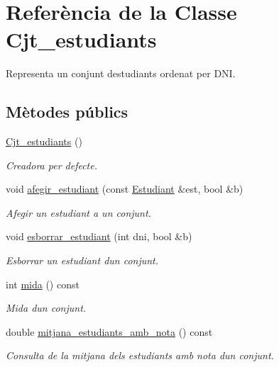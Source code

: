 \hypertarget{class_cjt__estudiants}{}\section{Referència de la Classe Cjt\+\_\+estudiants}
\label{class_cjt__estudiants}


Representa un conjunt d\textquotesingle{}estudiants ordenat per D\+NI.  


\subsection*{Mètodes públics}
\begin{DoxyCompactItemize}
\item 
\hyperlink{class_cjt__estudiants_a31ffe72cadcf58d82c8b9f6659c56e7a}{Cjt\+\_\+estudiants} ()
\begin{DoxyCompactList}\small\item\em Creadora per defecte. \end{DoxyCompactList}\item 
void \hyperlink{class_cjt__estudiants_a4188715904e017fa15b9ad8bc63112b6}{afegir\+\_\+estudiant} (const \hyperlink{class_estudiant}{Estudiant} \&est, bool \&b)
\begin{DoxyCompactList}\small\item\em Afegir un estudiant a un conjunt. \end{DoxyCompactList}\item 
void \hyperlink{class_cjt__estudiants_a6632e0cecaa9d698cb51da07c9e58402}{esborrar\+\_\+estudiant} (int dni, bool \&b)
\begin{DoxyCompactList}\small\item\em Esborrar un estudiant d\textquotesingle{}un conjunt. \end{DoxyCompactList}\item 
int \hyperlink{class_cjt__estudiants_a87c69704a0eff48a301cfff05e6dd587}{mida} () const
\begin{DoxyCompactList}\small\item\em Mida d\textquotesingle{}un conjunt. \end{DoxyCompactList}\item 
double \hyperlink{class_cjt__estudiants_a8c8099d5080864a677743e5e1d1bbdf8}{mitjana\+\_\+estudiants\+\_\+amb\+\_\+nota} () const
\begin{DoxyCompactList}\small\item\em Consulta de la mitjana dels estudiants amb nota d\textquotesingle{}un conjunt. \end{DoxyCompactList}\item 

\end{DoxyCompactItemize}

